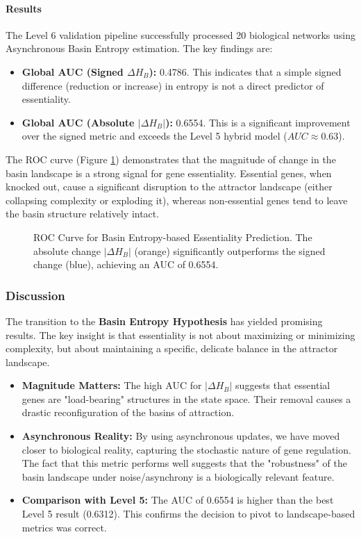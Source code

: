 \paragraph{Results}
The Level 6 validation pipeline successfully processed 20 biological networks using Asynchronous Basin Entropy estimation. The key findings are:

\begin{itemize}
    \item \textbf{Global AUC (Signed $\Delta H_B$):} 0.4786. This indicates that a simple signed difference (reduction or increase) in entropy is not a direct predictor of essentiality.
    \item \textbf{Global AUC (Absolute $|\Delta H_B|$):} 0.6554. This is a significant improvement over the signed metric and exceeds the Level 5 hybrid model ($AUC \approx 0.63$).
\end{itemize}

The ROC curve (Figure \ref{fig:roc_basin}) demonstrates that the magnitude of change in the basin landscape is a strong signal for gene essentiality. Essential genes, when knocked out, cause a significant disruption to the attractor landscape (either collapsing complexity or exploding it), whereas non-essential genes tend to leave the basin structure relatively intact.

\begin{figure}[H]
    \centering
    \caption{ROC Curve for Basin Entropy-based Essentiality Prediction. The absolute change $|\Delta H_B|$ (orange) significantly outperforms the signed change (blue), achieving an AUC of 0.6554.}
    \label{fig:roc_basin}
\end{figure}

\subsubsection{Discussion}
The transition to the \textbf{Basin Entropy Hypothesis} has yielded promising results. The key insight is that essentiality is not about maximizing or minimizing complexity, but about maintaining a specific, delicate balance in the attractor landscape.

\begin{itemize}
    \item \textbf{Magnitude Matters:} The high AUC for $|\Delta H_B|$ suggests that essential genes are "load-bearing" structures in the state space. Their removal causes a drastic reconfiguration of the basins of attraction.
    \item \textbf{Asynchronous Reality:} By using asynchronous updates, we have moved closer to biological reality, capturing the stochastic nature of gene regulation. The fact that this metric performs well suggests that the "robustness" of the basin landscape under noise/asynchrony is a biologically relevant feature.
    \item \textbf{Comparison with Level 5:} The AUC of 0.6554 is higher than the best Level 5 result (0.6312). This confirms the decision to pivot to landscape-based metrics was correct.
\end{itemize}

